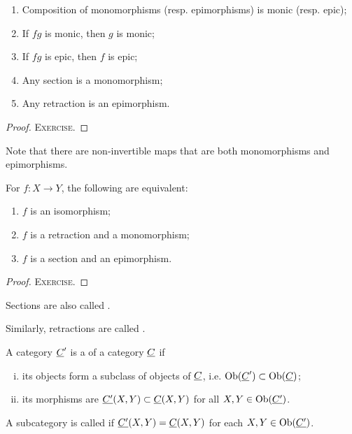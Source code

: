 \begin{lemma*}
	\hfill
	\begin{enumerate}
		\item Composition of monomorphisms (resp. epimorphisms) is monic (resp. epic);
		\item If \( fg \) is monic, then \( g \) is monic;
		\item If \( fg \) is epic, then \( f \) is epic;
		\item Any section is a monomorphism;
		\item Any retraction is an epimorphism.
	\end{enumerate}
\end{lemma*}
\begin{proof}
	\textsc{Exercise.}
\end{proof}

\vspace*{2mm}

Note that there are non-invertible maps that are both monomorphisms and epimorphisms.

\vspace*{2mm}

\begin{lemma*}
	For \( f: X \to Y \), the following are equivalent:
	\begin{enumerate}
		\item \( f \) is an isomorphism;
		\item \( f \) is a retraction and a monomorphism;
		\item \( f \) is a section and an epimorphism.
	\end{enumerate}
\end{lemma*}
\begin{proof}
	\textsc{Exercise.}
\end{proof}

\begin{remarks*}
	\item Sections are also called .
	\item Similarly, retractions are called .
\end{remarks*}

\begin{definition*}
	A category \( \underline{C}' \) is a  of a category \( \underline{C} \) if
	\begin{enumerate}[(i)]
		\item its objects form a subclass of objects of \( \underline{C} \), i.e. \( \operatorname{Ob}(\underline{C}') \subset \operatorname{Ob}(\underline{C}) \);
		\item its morphisms are \( \underline{C'}(X, Y) \subset \underline{C}(X, Y) \) for all \( X, Y \in \operatorname{Ob}(\underline{C'}) \).
	\end{enumerate}
	A subcategory is called  if \( \underline{C'}(X, Y) = \underline{C}(X, Y) \) for each \( X, Y \in \operatorname{Ob}(\underline{C'}) \).
\end{definition*}